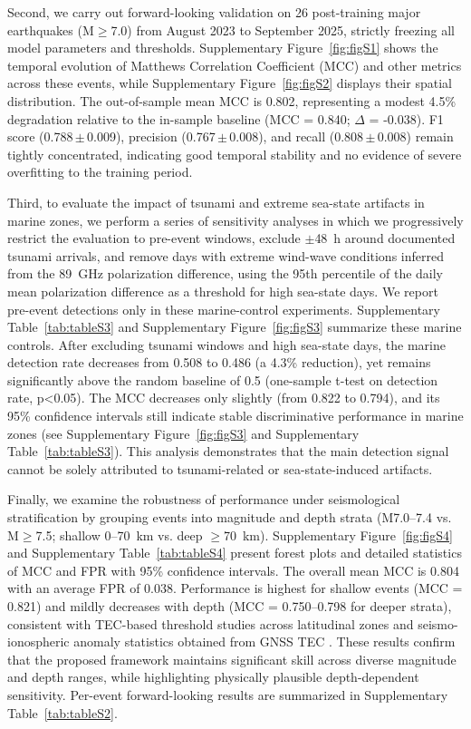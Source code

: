 \documentclass[preprint,review,12pt,authoryear]{elsarticle}
\begin{document}
Second, we carry out forward-looking validation on 26 post-training major earthquakes (M$\ge$7.0) from August 2023 to September 2025, strictly freezing all model parameters and thresholds. Supplementary Figure~\ref{fig:figS1} shows the temporal evolution of Matthews Correlation Coefficient (MCC) and other metrics across these events, while Supplementary Figure~\ref{fig:figS2} displays their spatial distribution. The out-of-sample mean MCC is 0.802, representing a modest 4.5\% degradation relative to the in-sample baseline (MCC = 0.840; $\Delta$ = -0.038). F1 score (0.788\,$\pm$\,0.009), precision (0.767\,$\pm$\,0.008), and recall (0.808\,$\pm$\,0.008) remain tightly concentrated, indicating good temporal stability and no evidence of severe overfitting to the training period.

Third, to evaluate the impact of tsunami and extreme sea-state artifacts in marine zones, we perform a series of sensitivity analyses in which we progressively restrict the evaluation to pre-event windows, exclude $\pm$48~h around documented tsunami arrivals, and remove days with extreme wind-wave conditions inferred from the 89~GHz polarization difference, using the 95th percentile of the daily mean polarization difference as a threshold for high sea-state days. We report pre-event detections only in these marine-control experiments. Supplementary Table~\ref{tab:tableS3} and Supplementary Figure~\ref{fig:figS3} summarize these marine controls. After excluding tsunami windows and high sea-state days, the marine detection rate decreases from 0.508 to 0.486 (a 4.3\% reduction), yet remains significantly above the random baseline of 0.5 (one-sample t-test on detection rate, p<0.05). The MCC decreases only slightly (from 0.822 to 0.794), and its 95\% confidence intervals still indicate stable discriminative performance in marine zones (see Supplementary Figure~\ref{fig:figS3} and Supplementary Table~\ref{tab:tableS3}). This analysis demonstrates that the main detection signal cannot be solely attributed to tsunami-related or sea-state-induced artifacts.

Finally, we examine the robustness of performance under seismological stratification by grouping events into magnitude and depth strata (M7.0--7.4 vs. M$\ge$7.5; shallow 0--70~km vs. deep $\ge$70~km). Supplementary Figure~\ref{fig:figS4} and Supplementary Table~\ref{tab:tableS4} present forest plots and detailed statistics of MCC and FPR with 95\% confidence intervals. The overall mean MCC is 0.804 with an average FPR of 0.038. Performance is highest for shallow events (MCC = 0.821) and mildly decreases with depth (MCC = 0.750--0.798 for deeper strata), consistent with TEC-based threshold studies across latitudinal zones and seismo-ionospheric anomaly statistics obtained from GNSS TEC \citep{shahJin2015,shahTotalElectronContent2020,shahASR2022}. These results confirm that the proposed framework maintains significant skill across diverse magnitude and depth ranges, while highlighting physically plausible depth-dependent sensitivity. Per-event forward-looking results are summarized in Supplementary Table~\ref{tab:tableS2}.
\end{document}
